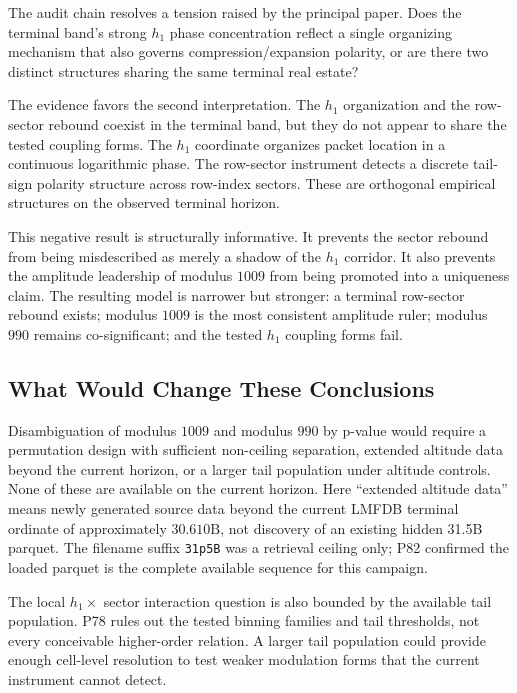\documentclass[11pt]{article}
\begin{document}
The audit chain resolves a tension raised by the principal paper. Does
the terminal band's strong $h_1$ phase concentration reflect a single
organizing mechanism that also governs compression/expansion polarity,
or are there two distinct structures sharing the same terminal real
estate?

The evidence favors the second interpretation. The $h_1$ organization
and the row-sector rebound coexist in the terminal band, but they do
not appear to share the tested coupling forms. The $h_1$ coordinate
organizes packet location in a continuous logarithmic phase. The
row-sector instrument detects a discrete tail-sign polarity structure
across row-index sectors. These are orthogonal empirical structures on
the observed terminal horizon.

This negative result is structurally informative. It prevents the
sector rebound from being misdescribed as merely a shadow of the $h_1$
corridor. It also prevents the amplitude leadership of modulus $1009$
from being promoted into a uniqueness claim. The resulting model is
narrower but stronger: a terminal row-sector rebound exists; modulus
$1009$ is the most consistent amplitude ruler; modulus $990$ remains
co-significant; and the tested $h_1$ coupling forms fail.

\subsection{What Would Change These Conclusions}

Disambiguation of modulus $1009$ and modulus $990$ by p-value would
require a permutation design with sufficient non-ceiling separation,
extended altitude data beyond the current horizon, or a larger tail
population under altitude controls. None of these are available on the
current horizon. Here ``extended altitude data'' means newly generated
source data beyond the current LMFDB terminal ordinate of approximately
$30.610\mathrm{B}$, not discovery of an existing hidden 31.5B parquet.
The filename suffix \texttt{31p5B} was a retrieval ceiling only; P82
confirmed the loaded parquet is the complete available sequence for
this campaign.

The local $h_1 \times$ sector interaction question is also bounded by
the available tail population. P78 rules out the tested binning
families and tail thresholds, not every conceivable higher-order
relation. A larger tail population could provide enough cell-level
resolution to test weaker modulation forms that the current instrument
cannot detect.
\end{document}
